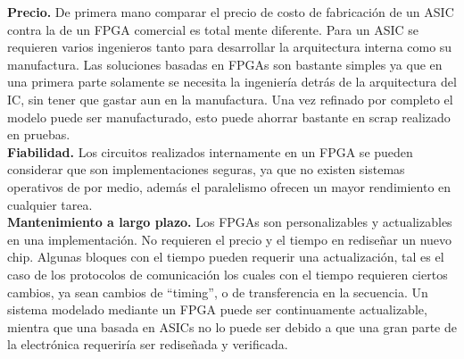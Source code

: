 \documentclass[twoside,spanish,ESP,MSc]{plantillaLabUPV}
\theoremstyle{definition}
\newcommand{\f}{FPGA }
\newcommand{\fs}{FPGAs }
\begin{document}
\checkmark\textbf{Precio.} De primera mano comparar el precio de costo de fabricación de un ASIC contra la de un \f comercial es total mente diferente. Para un ASIC se requieren varios ingenieros tanto para desarrollar la arquitectura interna como su manufactura. Las soluciones basadas en \fs son bastante simples ya que en una primera parte solamente se necesita la ingeniería detrás de la arquitectura del IC, sin tener que gastar aun en la manufactura. Una vez refinado por completo el modelo puede ser manufacturado, esto puede ahorrar bastante en scrap realizado en pruebas.\\%


\checkmark\textbf{Fiabilidad.} Los circuitos realizados internamente en un \f se pueden considerar que son implementaciones seguras, ya que no existen sistemas operativos de por medio, además el paralelismo ofrecen un mayor rendimiento en cualquier tarea. \\

\checkmark\textbf{Mantenimiento a largo plazo.} Los \fs son personalizables y actualizables en una implementación. No requieren el precio y el tiempo en rediseñar un nuevo chip. Algunas bloques con el tiempo pueden requerir una actualización, tal es el caso de los protocolos de comunicación los cuales con el tiempo requieren ciertos cambios, ya sean cambios de ``timing'', o de transferencia en la secuencia. Un sistema modelado mediante un FPGA puede ser continuamente actualizable, mientra que una basada en ASICs no lo puede ser debido a que una gran parte de la electrónica requeriría ser rediseñada y verificada. 


\end{document}

